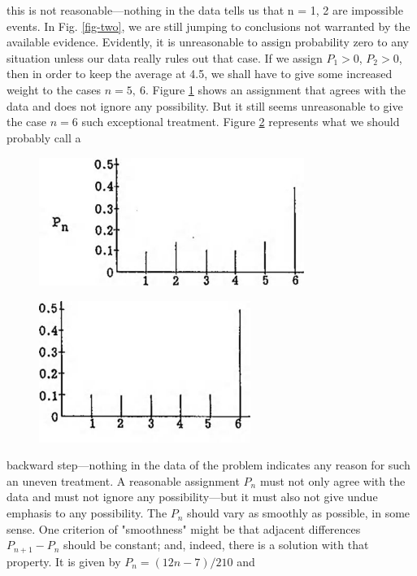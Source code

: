 \documentclass[]{article}
\begin{document}
this is not reasonable---nothing in the data tells us that n = 1, 2 are
impossible events. In Fig. \ref{fig-two}, we are still jumping to conclusions not
warranted by the available evidence. Evidently, it is unreasonable to
assign probability zero to any situation unless our data really rules
out that case. If we assign \(P_{1} > 0\), \(P_{2} > 0\), then in order
to keep the average at 4.5, we shall have to give some increased weight
to the cases \(n = 5,\ 6\). Figure \ref{fig-three} shows an assignment that agrees
with the data and does not ignore any possibility. But it still seems
unreasonable to give the case \(n = 6\) such exceptional treatment.
Figure \ref{fig-four} represents what we should probably call a
\begin{figure}
    \centering
    \includegraphics[width=3.39764in,height=1.64567in]{media/image3.jpeg}
    \caption{}
    \label{fig-three}
\end{figure}
\begin{figure}
    \centering
    \includegraphics[width=2.71319in,height=1.81042in]{media/image4.jpeg}
    \caption{}
    \label{fig-four}
\end{figure}
backward
step---nothing in the data of the problem indicates any reason for such
an uneven treatment. A reasonable assignment \(P_{n}\) must not only
agree with the data and must not ignore any possibility---but
it must also not give undue emphasis to any possibility. The \(P_{n}\)
should vary as smoothly as possible, in some sense. One criterion of
"smoothness" might be that adjacent differences \(P_{n + 1} - P_{n}\)
should be constant; and, indeed, there is a solution with that property.
It is given by \(P_{n} = (12n - 7)/210\) and
\end{document}
